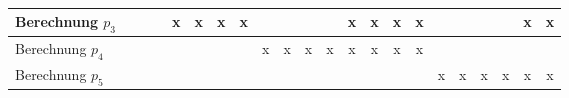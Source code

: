 \begin{sidewaystable}
\begin{tabular}{|p{2.3cm}|c|c|c|c|c|c|c|c|c|c|c|c|c|c|c|c|c|c|c|c|c|}
        \hline
        Berechnung $p_3$      &                                            &                                            &                                            & x                                          & x                                          & x                                          & x                                          &                                            &                                            &                                            &                                            & x                                          & x                                          & x                                          & x                                          &                                            &                                            &                                            &                                            & x                                          & x                                          \\
        \hline
        Berechnung $p_4$      &                                            &                                            &                                            &                                            &                                            &                                            &                                            & x                                          & x                                          & x                                          & x                                          & x                                          & x                                          & x                                          & x                                          &                                            &                                            &                                            &                                            &                                            &                                            \\
        \hline
        Berechnung $p_5$      &                                            &                                            &                                            &                                            &                                            &                                            &                                            &                                            &                                            &                                            &                                            &                                            &                                            &                                            &                                            & x                                          & x                                          & x                                          & x                                          & x                                          & x                                          \\
        \hline
    \end{tabular}
    \caption{}
\end{sidewaystable}

\FloatBarrier
